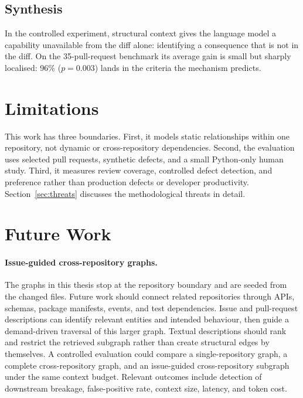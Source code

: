 \subsection*{Synthesis}

In the controlled experiment, structural context gives the language model a
capability unavailable from the diff alone: identifying a consequence that is
not in the diff. On the
35-pull-request benchmark its average gain is small but sharply localised:
96\% ($p = 0.003$) lands in the criteria the mechanism
predicts.

\section{Limitations}
\label{sec:conclusion-limitations}

This work has three boundaries. First, it models static relationships within
one repository, not dynamic or cross-repository dependencies. Second, the
evaluation uses selected pull requests, synthetic defects, and a small
Python-only human study. Third, it measures review coverage, controlled
defect detection, and preference rather than production defects or developer
productivity. Section~\ref{sec:threats} discusses the methodological threats
in detail.

\section{Future Work}
\label{sec:conclusion-future}

\paragraph{Issue-guided cross-repository graphs.}
The graphs in this thesis stop at the repository boundary and are seeded from
the changed files. Future work should connect related repositories through
APIs, schemas, package manifests, events, and test dependencies. Issue and
pull-request descriptions can identify relevant entities and intended
behaviour, then guide a demand-driven traversal of this larger graph. Textual
descriptions should rank and restrict the retrieved subgraph rather than create
structural edges by themselves. A controlled evaluation could compare a
single-repository graph, a complete cross-repository graph, and an issue-guided
cross-repository subgraph under the same context budget. Relevant outcomes
include detection of downstream breakage, false-positive rate, context size,
latency, and token cost.

